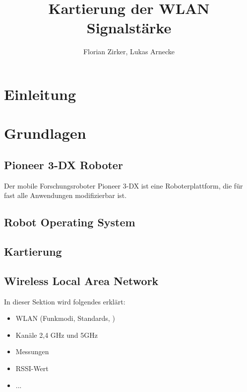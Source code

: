 \documentclass{scrartcl}%
\begin{document}
\titlehead{AMR}%
\subject{Projektbericht AMR}%
\title{Kartierung der WLAN Signalstärke}%
\author{Florian Zirker, Lukas Arnecke}%
\publishers{Prof. Dr. Thomas Ihme}%
\maketitle%
\tableofcontents

\section{Einleitung}

\section{Grundlagen}
\subsection{Pioneer 3-DX Roboter}
Der mobile Forschungsroboter Pioneer 3-DX ist eine Roboterplattform, die für fast alle Anwendungen modifizierbar ist.
\subsection{Robot Operating System}
\subsection{Kartierung}

\subsection{Wireless Local Area Network}
In dieser Sektion wird folgendes erklärt:
\begin{itemize}
	\item WLAN (Funkmodi, Standards, )
	\item Kanäle 2,4 GHz und 5GHz
	\item Messungen
	\item RSSI-Wert
	\item ...
\end{itemize}
\end{document}
